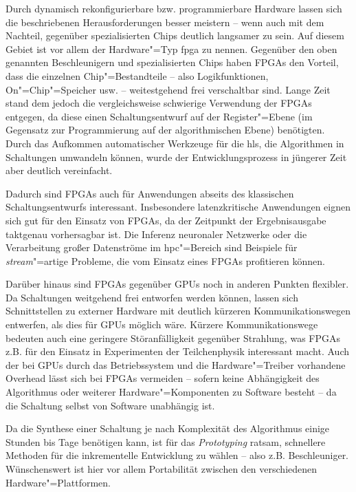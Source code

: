 Durch dynamisch rekonfigurierbare bzw. programmierbare Hardware lassen sich die
beschriebenen Herausforderungen besser meistern -- wenn auch mit dem Nachteil,
gegenüber spezialisierten Chips deutlich langsamer zu sein. Auf diesem Gebiet
ist vor allem der Hardware"=Typ \gls{fpga} zu nennen. Gegenüber den oben
genannten Beschleunigern und spezialisierten Chips haben FPGAs den Vorteil, dass
die einzelnen Chip"=Bestandteile -- also Logikfunktionen, On"=Chip"=Speicher
usw. -- weitestgehend frei verschaltbar sind. 
Lange Zeit stand dem jedoch die vergleichsweise schwierige Verwendung der
FPGAs entgegen, da diese einen Schaltungsentwurf auf der Register"=Ebene (im
Gegensatz zur Programmierung auf der algorithmischen Ebene) benötigten. Durch
das Aufkommen automatischer Werkzeuge für die \gls{hls}, die Algorithmen in
Schaltungen umwandeln können, wurde der Entwicklungsprozess in jüngerer Zeit
aber deutlich vereinfacht.

Dadurch sind FPGAs auch für Anwendungen abseits des klassischen
Schaltungsentwurfs interessant. Insbesondere latenzkritische Anwendungen eignen
sich gut für den Einsatz von FPGAs, da der Zeitpunkt der Ergebnisausgabe
taktgenau vorhersagbar ist. Die Inferenz neuronaler Netzwerke oder die
Verarbeitung großer Datenströme im \gls{hpc}"=Bereich sind Beispiele für
\textit{stream}"=artige Probleme, die vom Einsatz eines FPGAs profitieren
können.

Darüber hinaus sind FPGAs gegenüber GPUs noch in anderen Punkten flexibler. Da
Schaltungen weitgehend frei entworfen werden können, lassen sich Schnittstellen
zu externer Hardware mit deutlich kürzeren Kommunikationswegen entwerfen, als
dies für GPUs möglich wäre. Kürzere Kommunikationswege bedeuten auch eine
geringere Störanfälligkeit gegenüber Strahlung, was FPGAs z.B. für den Einsatz
in Experimenten der Teilchenphysik interessant macht. Auch der bei GPUs durch
das Betriebssystem und die Hardware"=Treiber vorhandene Overhead lässt sich bei
FPGAs vermeiden -- sofern keine Abhängigkeit des Algorithmus oder weiterer
Hardware"=Komponenten zu Software besteht -- da die Schaltung selbst von
Software unabhängig ist.

Da die Synthese einer Schaltung je nach Komplexität des Algorithmus einige
Stunden bis Tage benötigen kann, ist für das \textit{Prototyping} ratsam,
schnellere Methoden für die inkrementelle Entwicklung zu wählen -- also z.B.
Beschleuniger. Wünschenswert ist hier vor allem Portabilität zwischen den
verschiedenen Hardware"=Plattformen.

